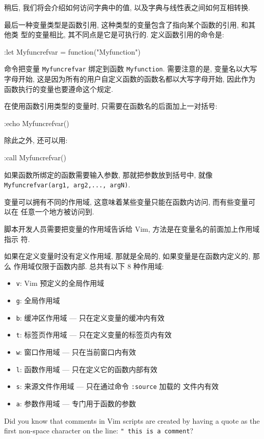 稍后, 我们将会介绍如何访问字典中的值, 以及字典与线性表之间如何互相转换.

最后一种变量类型是函数引用, 这种类型的变量包含了指向某个函数的引用, 和其他类
型的变量相比, 其不同点是它是可执行的. 定义函数引用的命令是:
\begin{vimcode}
:let Myfuncrefvar = function("Myfunction")
\end{vimcode}
命令把变量 \texttt{Myfuncrefvar} 绑定到函数 \texttt{Myfunction}. 需要注意的是,
变量名以大写字母开始, 这是因为所有的用户自定义函数的函数名都以大写字母开始,
因此作为函数执行的变量也要遵命这个规定.

在使用函数引用类型的变量时, 只需要在函数名的后面加上一对括号:
\begin{vimcode}
:echo Myfuncrefvar()
\end{vimcode}
除此之外, 还可以用:
\begin{vimcode}
:call Myfuncrefvar()
\end{vimcode}

如果函数所绑定的函数需要输入参数, 那就把参数放到括号中, 就像
\texttt{Myfuncrefvar(arg1, arg2,..., argN)}.

变量可以拥有不同的作用域, 这意味着某些变量只能在函数内访问, 而有些变量可以在
任意一个地方被访问到.

脚本开发人员需要把变量的作用域告诉给 Vim, 方法是在变量名的前面加上作用域指示
符.

如果在定义变量时没有定义作用域, 那就是全局的, 如果变量是在函数内定义的, 那么
作用域仅限于函数内部. 总共有以下 8 种作用域:
\begin{itemize}
    \item \texttt{v}: Vim 预定义的全局作用域
    \item \texttt{g}: 全局作用域
    \item \texttt{b}: 缓冲区作用域 --- 只在定义变量的缓冲内有效
    \item \texttt{t}: 标签页作用域 --- 只在定义变量的标签页内有效
    \item \texttt{w}: 窗口作用域 --- 只在当前窗口内有效
    \item \texttt{l}: 函数作用域 --- 只在定义它的函数内部有效
    \item \texttt{s}: 来源文件作用域 --- 只在通过命令 \texttt{:source} 加载的
        文件内有效
    \item \texttt{a}: 参数作用域 --- 专门用于函数的参数
\end{itemize}

\begin{warning}
    Did you know that comments in Vim scripts are created by having a quote as
    the first non-space character on the line: \texttt{" this is a comment}?
\end{warning}

